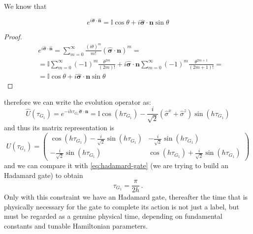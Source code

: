 We know that
\begin{theorem}
\begin{equation*}
e^{i\hat{\boldsymbol{\sigma}} \cdot \hat{\boldsymbol{n}}} = \mathbb{I}\cos\theta + i\hat{\boldsymbol{\sigma}} \cdot \boldsymbol{n} \sin\theta
\end{equation*}
\end{theorem}
\begin{proof}
\begin{equation*}
\begin{split}
 &e^{i\hat{\boldsymbol{\sigma}} \cdot \hat{\boldsymbol{n}}}  =  \sum_{m=0}^\infty \frac{(i\theta)^m}{m!} (\hat{\boldsymbol{\sigma}} \cdot \boldsymbol{n} )^m = \\
    &= \mathbb{I} \sum_{m=0}^\infty (-1)^m \frac{\theta^{2m}}{(2m)!}  + i\hat{\boldsymbol{\sigma}} \cdot \boldsymbol{n} \sum_{m=0}^\infty (-1)^m \frac{\theta^{2m+1}}{(2m+1)!} = \\
&= \mathbb{I}\cos\theta + i\hat{\boldsymbol{\sigma}} \cdot \boldsymbol{n} \sin\theta
\end{split}
\end{equation*}
\end{proof}
therefore we can write the evolution operator as:
\begin{equation*}
    \hat{U}(\tau_{G_1}) = e^{-ih\tau_{G_1} \hat{\boldsymbol{\sigma}} \cdot \boldsymbol{n}} = \mathbb{I}\cos(h\tau_{G_1}) - \frac{i}{\sqrt{2}} (\hat{\sigma}^x + \hat{\sigma}^z) \sin(h\tau_{G_1})
\end{equation*}
and thus its matrix representation is
\begin{equation*}
    U(\tau_{G_1}) = 
    \begin{pmatrix}
    \cos(h\tau_{G_1}) - \frac{i}{\sqrt{2}} \sin(h\tau_{G_1})  & - \frac{i}{\sqrt{2}} \sin(h\tau_{G_1}) \\
    - \frac{i}{\sqrt{2}} \sin(h\tau_{G_1}) & \cos(h\tau_{G_1}) + \frac{i}{\sqrt{2}} \sin(h\tau_{G_1})
    \end{pmatrix}
\end{equation*}
and we can compare it with \eqref{eq:hadamard-gate} (we are trying to build an Hadamard gate) to obtain
\begin{equation*}
    \tau_{G_1} = \frac{\pi}{2h}\,.
\end{equation*}
Only with this constraint we have an Hadamard gate, thereafter the time that is physically necessary for the gate to complete its action is not just a
label, but must be regarded as a genuine physical time, depending on fundamental constants and tunable Hamiltonian parameters.
